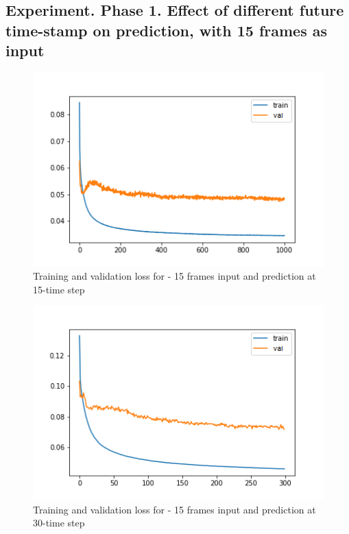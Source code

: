 \subsection{Experiment. Phase 1. Effect of different future time-stamp on prediction, with 15 frames as input}
\begin{figure}[H] 
\includegraphics[scale=0.75]{conf7_1000e_15ffuture}
\begin{center}
\caption{Training and validation loss for - 15 frames input and prediction at 15-time step }
\label{fig:15-15}
\end{center}
\end{figure}

\begin{figure}[H] 
\includegraphics[scale=0.75]{conf8_300e_30ffuture}
\begin{center}
\caption{Training and validation loss for - 15 frames input and prediction at 30-time step }
\label{fig:15-30}
\end{center}
\end{figure}

